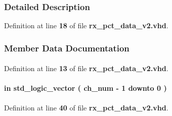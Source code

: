 \subsubsection{Detailed Description}


Definition at line {\bf 18} of file {\bf rx\+\_\+pct\+\_\+data\+\_\+v2.\+vhd}.



\subsubsection{Member Data Documentation}
\paragraph[{ all }]{\hspace{0.3cm}{\ttfamily [Package]}}\label{classrx__pct__data__v2_a470a86ce8776f637b0483eabf2d92ad2}


Definition at line {\bf 13} of file {\bf rx\+\_\+pct\+\_\+data\+\_\+v2.\+vhd}.

\paragraph[{ch\+\_\+en}]{ {\bfseries \textcolor{keywordflow}{in}\textcolor{vhdlchar}{ }} {\bfseries \textcolor{comment}{std\+\_\+logic\+\_\+vector}\textcolor{vhdlchar}{ }\textcolor{vhdlchar}{(}\textcolor{vhdlchar}{ }\textcolor{vhdlchar}{ }\textcolor{vhdlchar}{ }\textcolor{vhdlchar}{ }{\bfseries {\bf ch\+\_\+num}} \textcolor{vhdlchar}{-\/}\textcolor{vhdlchar}{ } \textcolor{vhdldigit}{1} \textcolor{vhdlchar}{ }\textcolor{keywordflow}{downto}\textcolor{vhdlchar}{ }\textcolor{vhdlchar}{ } \textcolor{vhdldigit}{0} \textcolor{vhdlchar}{ }\textcolor{vhdlchar}{)}\textcolor{vhdlchar}{ }} \hspace{0.3cm}{\ttfamily [Port]}}\label{classrx__pct__data__v2_ac6f35edba31976028a83a821781fcf1a}


Definition at line {\bf 40} of file {\bf rx\+\_\+pct\+\_\+data\+\_\+v2.\+vhd}.

